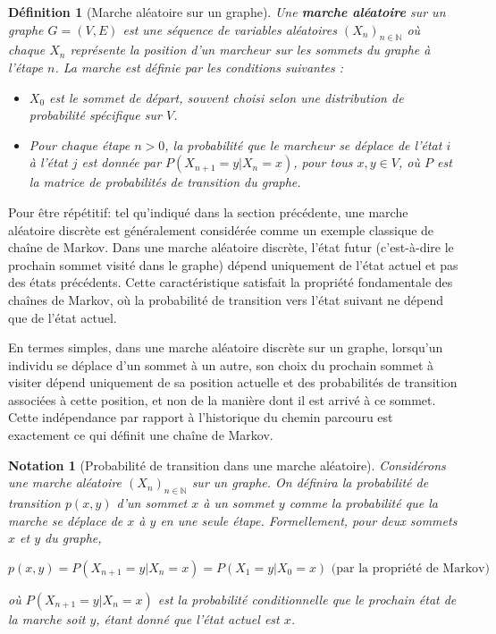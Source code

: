\documentclass{article}
\theoremstyle{pasdepoint}
\newtheorem{definition}{Définition}
\theoremstyle{break}
\theoremstyle{pasdepoint}
\newtheorem*{notation}{Notation}
\begin{document}
\begin{definition}[Marche aléatoire sur un graphe]
    Une \textbf{marche aléatoire} sur un graphe \(G = (V, E)\) est une séquence de variables aléatoires \((X_n)_{n\in\mathbb{N}}\) où chaque \(X_n\) représente la position d'un marcheur sur les sommets du graphe à l'étape \(n\). La marche est définie par les conditions suivantes :
    \begin{itemize}
        \item \(X_0\) est le sommet de départ, souvent choisi selon une distribution de probabilité spécifique sur \(V\).
        \item Pour chaque étape \(n > 0\), la probabilité que le marcheur se déplace de l'état \(i\) à l'état \(j\) est donnée par \(P(X_{n+1} = y | X_n = x)\), pour tous \(x, y \in V\), où \(P\) est la matrice de probabilités de transition du graphe.
    \end{itemize}
\end{definition}

Pour être répétitif: tel qu'indiqué dans la section précédente, une marche aléatoire discrète est généralement considérée comme un exemple classique de chaîne de Markov. Dans une marche aléatoire discrète, l'état futur (c'est-à-dire le prochain sommet visité dans le graphe) dépend uniquement de l'état actuel et pas des états précédents. Cette caractéristique satisfait la propriété fondamentale des chaînes de Markov, où la probabilité de transition vers l'état suivant ne dépend que de l'état actuel.

En termes simples, dans une marche aléatoire discrète sur un graphe, lorsqu'un individu se déplace d'un sommet à un autre, son choix du prochain sommet à visiter dépend uniquement de sa position actuelle et des probabilités de transition associées à cette position, et non de la manière dont il est arrivé à ce sommet. Cette indépendance par rapport à l'historique du chemin parcouru est exactement ce qui définit une chaîne de Markov.

\begin{notation}[Probabilité de transition dans une marche aléatoire]
    Considérons une marche aléatoire \( (X_n)_{n \in \mathbb{N}} \) sur un graphe. On définira la probabilité de transition \( p(x, y) \) d'un sommet \( x \) à un sommet \( y \) comme la probabilité que la marche se déplace de \( x \) à \( y \) en une seule étape. Formellement, pour deux sommets \( x \) et \( y \) du graphe,

    \[
    p(x, y) = P(X_{n+1} = y | X_n = x) = P(X_1 = y | X_0 = x)\text{ (par la propriété de Markov)}
    \]

    où \( P(X_{n+1} = y | X_n = x) \) est la probabilité conditionnelle que le prochain état de la marche soit \( y \), étant donné que l'état actuel est \( x \).
\end{notation}
\end{document}
